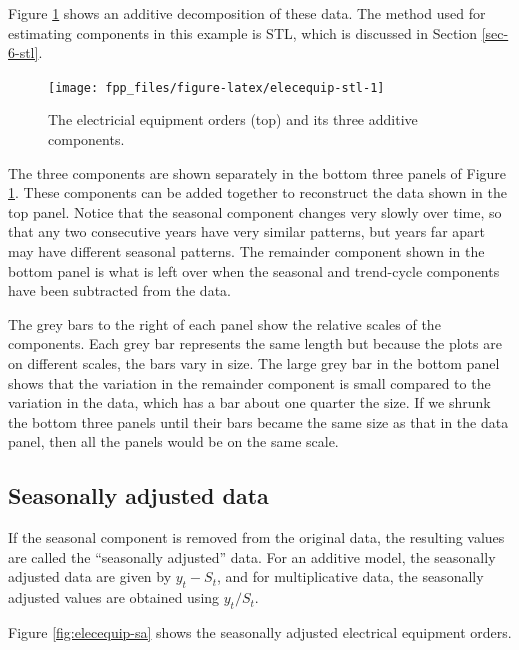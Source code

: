 \documentclass[]{book}
\begin{document}
Figure \ref{fig:elecequip-stl} shows an additive decomposition of these data. The method used for estimating components in this example is STL, which is discussed in Section \ref{sec-6-stl}.

\begin{figure}

{\centering \texttt{[image: fpp\_files/figure-latex/elecequip-stl-1]} 

}

\caption{The electricial equipment orders (top) and its three additive components.}\label{fig:elecequip-stl}
\end{figure}

The three components are shown separately in the bottom three panels of Figure \ref{fig:elecequip-stl}. These components can be added together to reconstruct the data shown in the top panel. Notice that the seasonal component changes very slowly over time, so that any two consecutive years have very similar patterns, but years far apart may have different seasonal patterns. The remainder component shown in the bottom panel is what is left over when the seasonal and trend-cycle components have been subtracted from the data.

The grey bars to the right of each panel show the relative scales of the components. Each grey bar represents the same length but because the plots are on different scales, the bars vary in size. The large grey bar in the bottom panel shows that the variation in the remainder component is small compared to the variation in the data, which has a bar about one quarter the size. If we shrunk the bottom three panels until their bars became the same size as that in the data panel, then all the panels would be on the same scale.

\hypertarget{seasonally-adjusted-data}{%
\subsection*{Seasonally adjusted data}\label{seasonally-adjusted-data}}

If the seasonal component is removed from the original data, the resulting values are called the ``seasonally adjusted'' data. For an additive model, the seasonally adjusted data are given by \(y_{t}-S_{t}\), and for multiplicative data, the seasonally adjusted values are obtained using \(y_{t}/S_{t}\).

Figure \ref{fig:elecequip-sa} shows the seasonally adjusted electrical equipment orders.
\end{document}
